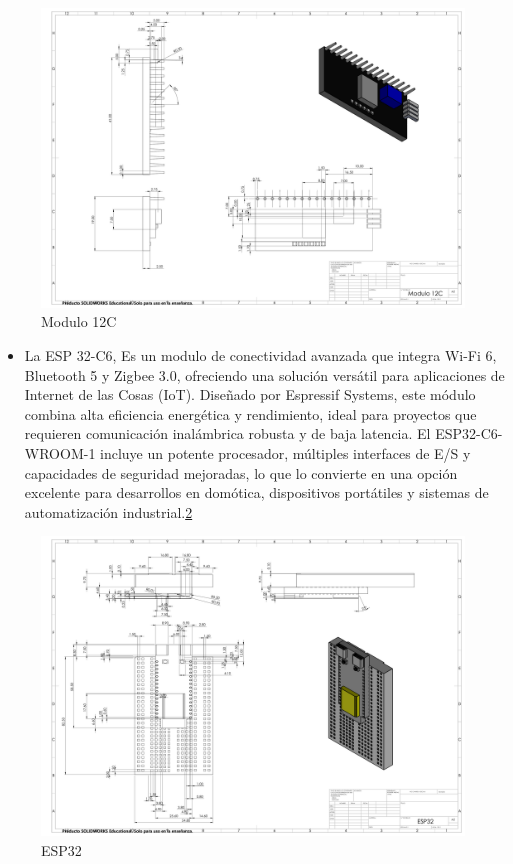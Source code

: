     \begin{figure}[H]
        \centering
       \includegraphics[trim = {10mm 10mm 10mm 10mm},clip,scale=0.120]{24/Img/modulo12C.pdf}
        \caption{Modulo 12C}
        \label{fig:Modulo 12C}
    \end{figure}
    \begin{itemize}
        \item 
        La ESP 32-C6, Es un modulo de conectividad avanzada que integra Wi-Fi 6, Bluetooth 5 y Zigbee 3.0, ofreciendo una solución versátil para aplicaciones de Internet de las Cosas (IoT). Diseñado por Espressif Systems, este módulo combina alta eficiencia energética y rendimiento, ideal para proyectos que requieren comunicación inalámbrica robusta y de baja latencia. El ESP32-C6-WROOM-1 incluye un potente procesador, múltiples interfaces de E/S y capacidades de seguridad mejoradas, lo que lo convierte en una opción excelente para desarrollos en domótica, dispositivos portátiles y sistemas de automatización industrial.\ref{fig:ESP32}
    \end{itemize}
    \begin{figure}[H]
        \centering
        \includegraphics[trim = {10mm 10mm 10mm 10mm},clip,scale=0.120]{24/Img/ESP32.pdf}
        \caption{ESP32}
        \label{fig:ESP32}
    \end{figure}
